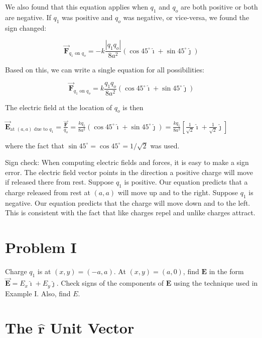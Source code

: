 \documentclass{article}
\newcommand{\ds}[0]{\displaystyle}
\newcommand{\ihat}[0]{\hat{\boldsymbol{\imath}}}
\newcommand{\jhat}[0]{\hat{\boldsymbol{\jmath}}}
\newcommand{\rhat}[0]{\hat{\mathbf{r}}}
\newcommand{\bfvec}[1]{\vec{\mathbf{#1}}}
\begin{document}
We also found that this equation applies when $q_1$ and $q_o$ are both positive or both are negative. If $q_1$ was positive and $q_o$ was negative, or vice-versa, we found the sign changed:

\begin{equation}
\bfvec{F}_{q_1\text{ on } q_o}=-k\frac{|q_1q_o|}{8a^2}(\cos 45^\circ \ihat + \sin 45^\circ \jhat)
\end{equation}

Based on this, we can write a single equation for all possibilities:

\begin{equation}
\bfvec{F}_{q_1\text{ on } q_o}=k\frac{q_1q_o}{8a^2}(\cos 45^\circ \ihat + \sin 45^\circ \jhat)
\end{equation}

The electric field at the location of $q_o$ is then 

$\ds\bfvec{E}_{\text{at }(a,a) \text{ due to }q_1} = \frac{\bfvec{F}}{q_o} = \frac{kq_1}{8a^2}(\cos 45^\circ \ihat + \sin 45^\circ \jhat) =\frac{kq_1}{8a^2}\left[\frac{1}{\sqrt{2}}\ihat + \frac{1}{\sqrt{2}}\jhat\right]$

where the fact that $\sin 45^\circ=\cos 45^\circ=1/\sqrt{2}$ was used.

Sign check: When computing electric fields and forces, it is easy to make a sign error. The electric field vector points in the direction a positive charge will move if released there from rest. Suppose $q_1$ is positive. Our equation predicts that a charge released from rest at $(a,a)$ will move up and to the right. Suppose $q_1$ is negative. Our equation predicts that the charge will move down and to the left. This is consistent with the fact that like charges repel and unlike charges attract.

\section{Problem I}

Charge $q_1$ is at $(x,y)=(-a,a)$. At $(x,y)=(a, 0)$, find $\mathbf{E}$ in the form $\bfvec{E}=E_x\ihat + E_y\jhat$. Check signs of the components of $\mathbf{E}$ using the technique used in Example I. Also, find $E$.



\newpage

\section{The $\rhat$ Unit Vector}
\end{document}

